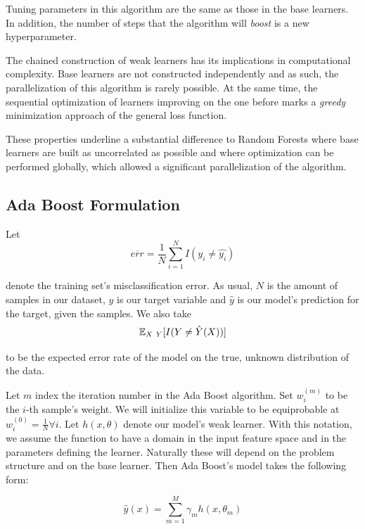 Tuning parameters in this algorithm are the same as those in the base learners. In addition, the number of steps that the algorithm will \textit{boost} is a new hyperparameter.

The chained construction of weak learners has its implications in computational complexity. Base learners are not constructed independently and as such, the parallelization of this algorithm is rarely possible. At the same time, the sequential optimization of learners improving on the one before marks a \textit{greedy} minimization approach of the general loss function.

These properties underline a substantial difference to Random Forests where base learners are built as uncorrelated as possible and where optimization can be performed globally, which allowed a significant parallelization of the algorithm.

\subsection{Ada Boost Formulation}

Let
\begin{equation}\label{equation-adaBoostTrainingError}
\overline{err} = \frac{1}{N} \sum_{i=1}^{N} I(y_i \neq \hat{y_i})
\end{equation}

denote the training set's misclassification error. As usual, $N$ is the amount of samples in our dataset, $y$ is our target variable and $\hat{y}$ is our model's prediction for the target, given the samples. We also take
\begin{equation}
\operatorname{\mathbb{E}}_{X \ Y} [ I(Y \neq \hat{Y}(X)) ]
\end{equation}

to be the expected error rate of the model on the true, unknown distribution of the data.

Let $m$ index the iteration number in the Ada Boost algorithm. Set $w^{(m)}_i$ to be the $i$-th sample's weight. We will initialize this variable to be equiprobable at $w^{(0)}_i = \frac{1}{N} \forall i$. Let $h(x,\theta)$ denote our model's weak learner. With this notation, we assume the function to have a domain in the input feature space and in the parameters defining the learner. Naturally these will depend on the problem structure and on the base learner. Then Ada Boost's model takes the following form:

\begin{equation}\label{equation-adaBoostModel}
\hat{y}(x) = \sum_{m=1}^{M} \gamma_m h(x,\theta_m)
\end{equation}

